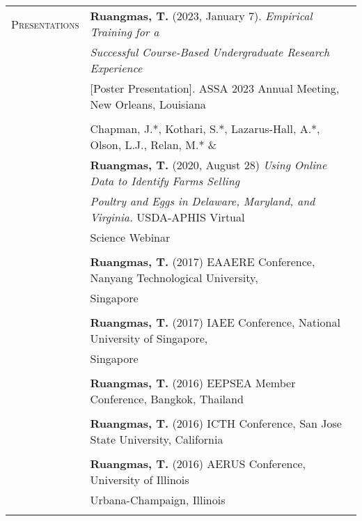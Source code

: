 \documentclass[letterpaper,11pt,oneside]{article}\usepackage[]{graphicx}\usepackage[]{xcolor}
\begin{document}
\newpage                        
\noindent \begin{tabular}{p{1.2in} l}	                         
\textsc{Presentations}  & \textbf{Ruangmas, T.} (2023, January 7). \textit{Empirical Training for a }\\
                        & \textit{Successful Course-Based Undergraduate Research Experience} \\
                        & [Poster Presentation]. ASSA 2023 Annual Meeting, New Orleans, Louisiana\\
                        & \\
                        & Chapman, J.*, Kothari, S.*, Lazarus-Hall, A.*, Olson, L.J., Relan, M.* \& \\
                        & \textbf{Ruangmas, T.} (2020, August 28) \textit{Using Online Data to Identify Farms Selling}\\
                        & \textit{Poultry and Eggs in Delaware, Maryland, and Virginia.} USDA-APHIS Virtual\\
                        & Science Webinar\\
                        & \\
                        & \textbf{Ruangmas, T.} (2017) EAAERE Conference, Nanyang Technological University, \\
                        & Singapore \\
	                      & \\
                        & \textbf{Ruangmas, T.} (2017) IAEE Conference, National University of Singapore, \\
                        & Singapore \\
                        & \\
                        & \textbf{Ruangmas, T.} (2016) EEPSEA Member Conference, Bangkok, Thailand \\
                        & \\
                        & \textbf{Ruangmas, T.} (2016) ICTH Conference, San Jose State University, California \\
                        & \\
                        & \textbf{Ruangmas, T.} (2016) AERUS Conference, University of Illinois \\
                        & Urbana-Champaign, Illinois \\
                        & \\
\end{tabular}
\end{document}
